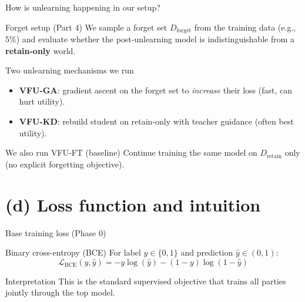 \documentclass[aspectratio=169, 11pt]{beamer}
\begin{document}
\begin{frame}{How is unlearning happening in our setup?}
  \begin{block}{Forget setup (Part 4)}
    We sample a forget set \(D_{\text{forget}}\) from the training data (e.g., 5\%) and evaluate
    whether the post-unlearning model is indistinguishable from a \textbf{retain-only} world.
  \end{block}
  \vspace{0.6em}
  \begin{alertblock}{Two unlearning mechanisms we run}
    \begin{itemize}
      \item \textbf{VFU-GA}: gradient ascent on the forget set to \emph{increase} their loss (fast, can hurt utility).
      \item \textbf{VFU-KD}: rebuild student on retain-only with teacher guidance (often best utility).
    \end{itemize}
  \end{alertblock}
  \vspace{0.4em}
  \begin{exampleblock}{We also run VFU-FT (baseline)}
    \small Continue training the same model on \(D_{\text{retain}}\) only (no explicit forgetting objective).
  \end{exampleblock}
\end{frame}

\section{(d) Loss function and intuition}

\begin{frame}{Base training loss (Phase 0)}
  \begin{block}{Binary cross-entropy (BCE)}
    For label \(y\in\{0,1\}\) and prediction \(\hat{y}\in(0,1)\):
    \[
      \mathcal{L}_{\text{BCE}}(y,\hat{y}) = -y\log(\hat{y})-(1-y)\log(1-\hat{y})
    \]
  \end{block}
  \vspace{0.6em}
  \begin{exampleblock}{Interpretation}
    This is the standard supervised objective that trains all parties jointly through the top model.
  \end{exampleblock}
\end{frame}
\end{document}
